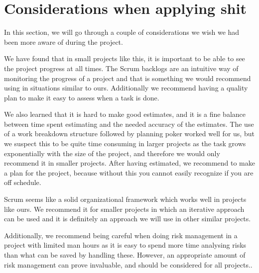 \section{Considerations when applying shit}
In this section, we will go through a couple of considerations we wish we had
been more aware of during the project.

We have found that in small projects like this, it is important to be able to
see the project progress at all times. The Scrum backlogs are an intuitive way
of monitoring the progress of a project and that is something we would
recommend using in situations similar to ours. Additionally we recommend having
a quality plan to make it easy to assess when a task is done.

We also learned that it is hard to make good estimates, and it is a fine
balance between time spent estimating and the needed accuracy of the estimates.
The use of a work breakdown structure followed by planning poker worked well
for us, but we suspect this to be quite time consuming in larger projects as
the task grows exponentially with the size of the project, and therefore we
would only recommend it in smaller projects. After having estimated, we
recommend to make a plan for the project, because without this you cannot
easily recognize if you are off schedule.

Scrum seems like a solid organizational framework which works well in projects
like ours. We recommend it for smaller projects in which an iterative approach
can be used and it is definitely an approach we will use in other similar
projects.

Additionally, we recommend being careful when doing risk management in a
project with limited man hours as it is easy to spend more time analysing risks
than what can be saved by handling these. However, an appropriate amount of
risk management can prove invaluable, and should be considered for all
projects..
